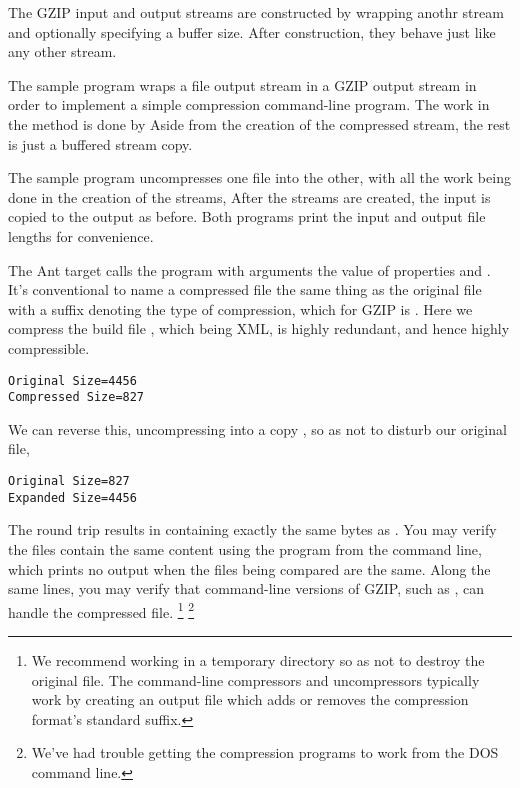 The GZIP input and output streams are constructed by wrapping anothr
stream and optionally specifying a buffer size.  After construction,
they behave just like any other stream. 

The sample program  wraps a file output
stream in a GZIP output stream in order to implement
a simple compression command-line program.  The work
in the  method is done by
%
%
Aside from the creation of the compressed stream, the
rest is just a buffered stream copy.  

The sample program  uncompresses one
file into the other, with all the work being done in
the creation of the streams,
%
%
After the streams are created, the input is copied to the output as
before.  Both programs print the input and output file lengths
for convenience.

The Ant target  calls the program with arguments
the value of properties  and .
It's conventional to name a compressed file the same thing as the
original file with a suffix denoting the type of compression,
which for GZIP is . Here we compress the build file
, which being XML, is highly redundant, and hence
highly compressible.
%
\begin{verbatim}
Original Size=4456
Compressed Size=827
\end{verbatim}
%
We can reverse this, uncompressing into a copy ,
so as not to disturb our original  file,
%
\begin{verbatim}
Original Size=827
Expanded Size=4456
\end{verbatim}
%
The round trip results in  containing exactly the
same bytes as .  You may verify the files contain the
same content using the  program from the command line,
%
%
which prints no output when the files being compared are the same.
Along the same lines, you may verify that command-line versions of
GZIP, such as , can handle the compressed file.%
%
\footnote{We recommend working in a temporary directory so as not to
  destroy the original  file.  The command-line
  compressors and uncompressors typically work by creating an output
  file which adds or removes the compression format's standard
  suffix.}%
\footnote{We've had trouble getting the compression programs to work from the
  DOS command line.}
%

